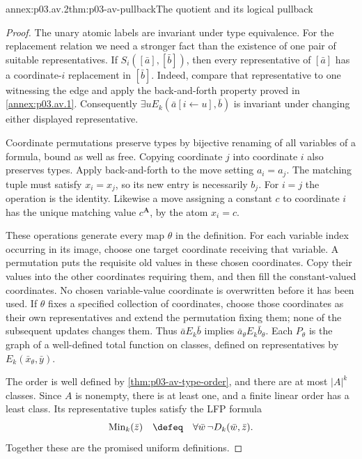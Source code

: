 \begin{annexitem}{annex:p03.av.2}{thm:p03-av-pullback}{The quotient and its logical pullback}
\begin{proof}
The unary atomic labels are invariant under type equivalence.
For the replacement relation we need a stronger fact than the
existence of one pair of suitable representatives. If
\(S_i([\bar a],[\bar b])\), then every representative of
\([\bar a]\) has a coordinate-\(i\) replacement in
\([\bar b]\). Indeed, compare that representative to one
witnessing the edge and apply the back-and-forth property proved in
\cref{annex:p03.av.1}. Consequently
\(\exists u E_k(\bar a[i\leftarrow u],\bar b)\) is invariant
under changing either displayed representative.

Coordinate permutations preserve types by bijective renaming of all
variables of a formula, bound as well as free. Copying coordinate
\(j\) into coordinate \(i\) also preserves types. Apply
back-and-forth to the move setting \(a_i=a_j\). The matching
tuple must satisfy \(x_i=x_j\), so its new entry is necessarily
\(b_j\). For \(i=j\) the operation is the identity.
Likewise a move assigning a constant \(c\) to coordinate
\(i\) has the unique matching value \(c^{\mathbf A}\),
by the atom \(x_i=c\).

These operations generate every map \(\theta\) in the definition.
For each variable index occurring in its image, choose one target
coordinate receiving that variable. A permutation puts the requisite
old values in these chosen coordinates. Copy their values into the
other coordinates requiring them, and then fill the constant-valued
coordinates. No chosen variable-value coordinate is overwritten
before it has been used. If \(\theta\) fixes a specified collection
of coordinates, choose those coordinates as their own representatives
and extend the permutation fixing them; none of the subsequent updates
changes them. Thus \(\bar a E_k\bar b\) implies
\(\bar a_\theta E_k\bar b_\theta\). Each \(P_\theta\)
is the graph of a well-defined total function on classes, defined on
representatives by \(E_k(\bar x_\theta,\bar y)\).

The order is well defined by \cref{thm:p03-av-type-order}, and
there are at most \(|A|^k\) classes. Since \(A\) is nonempty,
there is at least one, and a finite linear order has a least class.
Its representative tuples satisfy the LFP formula
\[
 \operatorname{Min}_k(\bar z)
       \quad\defeq\quad\forall\bar w\,\neg D_k(\bar w,\bar z).
\]
Together these are the promised uniform definitions.


\end{proof}
\end{annexitem}

